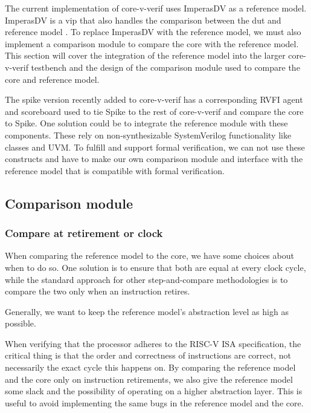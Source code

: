 The current implementation of core-v-verif uses ImperasDV as a reference model. ImperasDV is a \acrfull{vip} that also handles the comparison between the \acrshort{dut} and reference model \cite{imperassoftwareltdRISCVProcessorOVP2023}. To replace ImperasDV with the reference model, we must also implement a comparison module to compare the core with the reference model. This section will cover the integration of the reference model into the larger \gls{core-v-verif} testbench and the design of the comparison module used to compare the core and reference model.

The spike version recently added to core-v-verif has a corresponding RVFI agent and scoreboard used to tie Spike to the rest of core-v-verif and compare the core to Spike. One solution could be to integrate the reference module with these components. These rely on non-synthesizable SystemVerilog functionality \cite{mehtaIntroductionSystemVerilog2021} like classes and UVM. To fulfill  and support formal verification, we can not use these constructs and have to make our own comparison module and interface with the reference model that is compatible with formal verification.


\subsection{Comparison module}
\label{sec:des_comparison}

\subsubsection{Compare at retirement or clock}
\label{sec:des_retireOrClock}

When comparing the reference model to the core, we have some choices about when to do so. One solution is to ensure that both are equal at every clock cycle, while the standard approach for other step-and-compare methodologies is to compare the two only when an instruction retires.

Generally, we want to keep the reference model's abstraction level as high as possible. 

When verifying that the processor adheres to the RISC-V ISA specification, the critical thing is that the order and correctness of instructions are correct, not necessarily the exact cycle this happens on. By comparing the reference model and the core only on instruction retirements, we also give the reference model some slack and the possibility of operating on a higher abstraction layer. This is useful to avoid implementing the same bugs in the reference model and the core.

